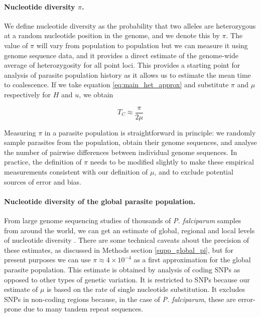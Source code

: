 \documentclass[_main.tex]{subfiles}
\begin{document}
\paragraph{Nucleotide diversity $\pi$.}  We define nucleotide diversity as the probability that two alleles are heterozygous at a random nucleotide position in the genome, and we denote this by $\pi$.  The value of $\pi$ will vary from population to population but we can measure it using genome sequence data, and it provides a direct estimate of the genome-wide average of heterozygosity for all point loci.  This provides a starting point for analysis of parasite population history as it allows us to estimate the mean time to coalescence.  If we take equation \ref{eq:main_het_approx} and substitute $\pi$ and $\mu$ respectively for $H$ and $u$, we obtain

\begin{equation}
T_C \approx \frac{\pi}{2 \mu}
\label{eq:main_Tc_pi}
\end{equation}

Measuring $\pi$ in a parasite population is straightforward in principle: we randomly sample parasites from the population, obtain their genome sequences, and analyse the number of pairwise differences between individual genome sequences. In practice, the definition of $\pi$ needs to be modified slightly to make these empirical measurements consistent with our definition of $\mu$, and to exclude potential sources of error and bias.


\paragraph{Nucleotide diversity of the global parasite population.} 
\label{main_global_diversity_1}

From large genome sequencing studies of thousands of \textit{P. falciparum} samples from around the world, we can get an estimate of global, regional and local levels of nucleotide diversity  \cite{MalariaGEN2021,MalariaGEN2023}.  There are some technical caveats about the precision of these estimates, as discussed in Methods section \ref{supp_global_pi}, but for present purposes we can use $\pi \approx 4 \times 10^{-4}$ as a first approximation for the global parasite population.  This estimate is obtained by analysis of coding SNPs as opposed to other types of genetic variation.  It is restricted to SNPs because our estimate of $\mu$ is based on the rate of single nucleotide substitution.  It excludes SNPs in non-coding regions because, in the case of \textit{P. falciparum}, these are error-prone due to many tandem repeat sequences.  
\end{document}
